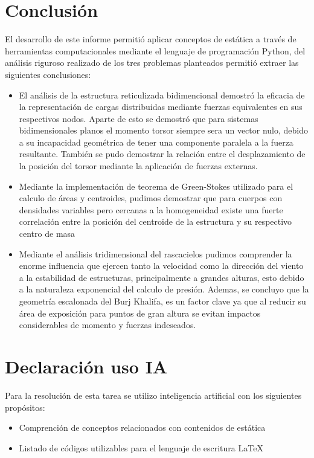 \documentclass[]{article}
\begin{document}
\section{Conclusión}
El desarrollo de este informe permitió aplicar conceptos de estática a través de herramientas computacionales mediante el lenguaje de programación Python, del análisis riguroso realizado de los tres problemas planteados permitió extraer las siguientes conclusiones:
\begin{itemize}
	\item El análisis de la estructura reticulizada bidimencional demostró la eficacia de la representación de cargas distribuidas mediante fuerzas equivalentes en sus respectivos nodos. Aparte de esto se demostró que para sistemas bidimensionales planos el momento torsor siempre sera un vector nulo, debido a su incapacidad geométrica de tener una componente paralela a la fuerza resultante. También se pudo demostrar la relación entre el desplazamiento de la posición del torsor mediante la aplicación de fuerzas externas.
	
	\item Mediante la implementación de teorema de Green-Stokes utilizado para el calculo de áreas y centroides, pudimos demostrar que para cuerpos con densidades variables pero cercanas a la homogeneidad existe una fuerte correlación entre la posición del centroide de la estructura y su respectivo centro de masa
	
	\item Mediante el análisis tridimensional del rascacielos pudimos comprender la enorme influencia que ejercen tanto la velocidad como la dirección del viento a la estabilidad de estructuras, principalmente a grandes alturas, esto debido a la naturaleza exponencial del calculo de presión. Ademas, se concluyo que la geometría escalonada del Burj Khalifa, es un factor clave ya que al reducir su área de exposición para puntos de gran altura se evitan impactos considerables de momento y fuerzas indeseados.	
\end{itemize}

\section{Declaración uso IA}
Para la resolución de esta tarea se utilizo inteligencia artificial con los siguientes propósitos:
\begin{itemize}
	\item Comprención de conceptos relacionados con contenidos de estática
	\item Listado de códigos utilizables para el lenguaje de escritura LaTeX
\end{itemize}
\end{document}
